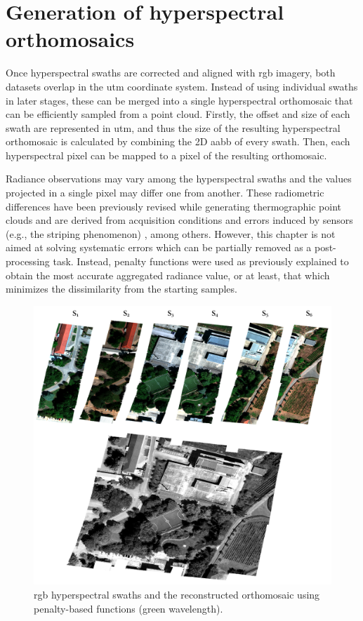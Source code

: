 \section{Generation of hyperspectral orthomosaics}

Once hyperspectral swaths are corrected and aligned with \acrshort{rgb} imagery, both datasets overlap in the \acrshort{utm} coordinate system. Instead of using individual swaths in later stages, these can be merged into a single hyperspectral orthomosaic that can be efficiently sampled from a point cloud. Firstly, the offset and size of each swath are represented in \acrshort{utm}, and thus the size of the resulting hyperspectral orthomosaic is calculated by combining the 2D \acrshort{aabb} of every swath. Then, each hyperspectral pixel can be mapped to a pixel of the resulting orthomosaic. 

Radiance observations may vary among the hyperspectral swaths and the values projected in a single pixel may differ one from another. These radiometric differences have been previously revised while generating thermographic point clouds and are derived from acquisition conditions and errors induced by sensors (e.g., the striping phenomenon) \cite{pu_hyperspectral_2017}, among others. However, this chapter is not aimed at solving systematic errors which can be partially removed as a post-processing task. Instead, penalty functions were used as previously explained to obtain the most accurate aggregated radiance value, or at least, that which minimizes the dissimilarity from the starting samples. 

\begin{figure}[bt]
    \centering
    \includegraphics[width=\linewidth]{figs/hyper_point_cloud/orthomosaic.png}
	\caption{\acrshort{rgb} hyperspectral swaths and the reconstructed orthomosaic using penalty-based functions (green wavelength). }
	\label{fig:hyper_band_fusion}
\end{figure}

